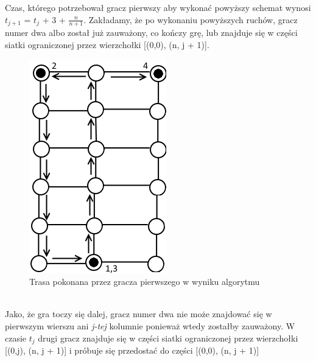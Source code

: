 \documentclass[brudnopis]{xmgr}
\begin{document}
Czas, którego potrzebował gracz pierwszy aby wykonać powyższy schemat wynosi $t_{j+1}$ = $t_j$ + 3 + $\frac{n}{n+1}$.
Zakładamy, że po wykonaniu powyższych ruchów, gracz numer dwa albo został już zauważony, co kończy grę, lub znajduje się w części siatki ograniczonej przez wierzchołki [(0,0), (n, j + 1)].
\begin{figure}[ht!]
  \centering
  \includegraphics{rysunki/schemat_ruchu.png}
  \caption{Trasa pokonana przez gracza pierwszego w wyniku algorytmu}
\end{figure} 
\\Jako, że gra toczy się dalej, gracz numer dwa nie może znajdować się w pierwszym wierszu ani \textit{j-tej} kolumnie ponieważ wtedy zostałby zauważony. W czasie \textit{$t_j$} drugi gracz znajduje się w części siatki ograniczonej przez wierzchołki [(0,j), (n, j + 1)] i próbuje się przedostać do części [(0,0), (n, j + 1)]
\end{document}

